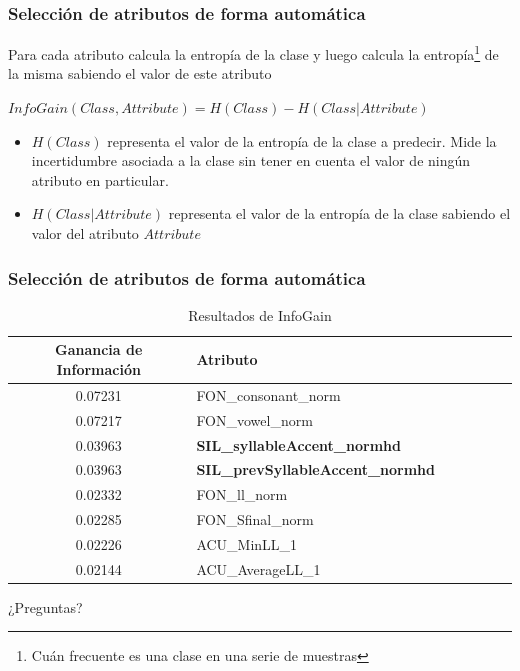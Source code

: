 \documentclass[mathserif]{beamer}%
\begin{document}
\begin{frame}
	\frametitle{Selección de atributos de forma automática}
	
	Para cada atributo calcula la entropía de la clase y luego calcula la entropía\footnote{Cuán frecuente es una clase en una serie de muestras} de la misma sabiendo el valor de este atributo
	
	\begin{center}
		$InfoGain(Class,Attribute) = H(Class) - H(Class | Attribute)$
	\end{center}
	
	\begin{itemize}
		\item $H(Class)$ representa el valor de la entropía de la clase a predecir. Mide la incertidumbre asociada a la clase sin tener en cuenta el valor de ningún atributo en particular.
		\item $H(Class | Attribute)$ representa el valor de la entropía de la clase sabiendo el valor del atributo $Attribute$
	\end{itemize}
\end{frame}

\begin{frame}
	\frametitle{Selección de atributos de forma automática}
		
	\begin{table}[H]
		\centering
		\begin{tabular}{|c|l|c|c|c|c|c|}
			\hline
			\textbf{Ganancia de Información} & \textbf{Atributo} \\ \hline
			0.07231     & FON\_consonant\_norm \\ \hline
			0.07217     & FON\_vowel\_norm \\ \hline
			0.03963     & \textbf{SIL\_syllableAccent\_normhd }\\ \hline
			0.03963     & \textbf{SIL\_prevSyllableAccent\_normhd} \\ \hline
			0.02332     & FON\_ll\_norm \\ \hline
			0.02285     & FON\_Sfinal\_norm \\ \hline
			0.02226     & ACU\_MinLL\_1 \\ \hline
			0.02144     & ACU\_AverageLL\_1 \\ \hline
		\end{tabular}
		\caption{Resultados de InfoGain}
		\label{infogain-table}
	\end{table}
\end{frame}

\begin{frame}
	\begin{center}
		{\Large ¿Preguntas?}
	\end{center}
\end{frame}

\end{document}
